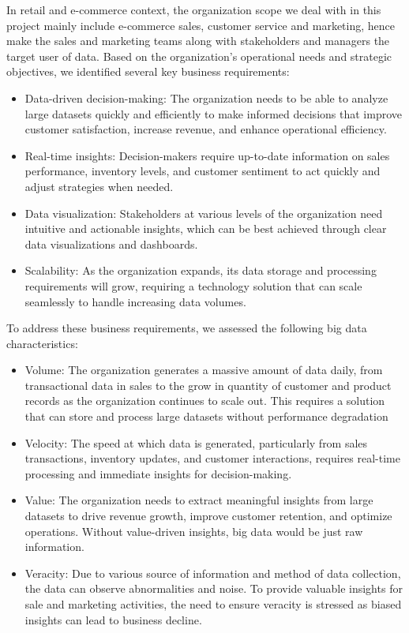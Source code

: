 In retail and e-commerce context, the organization scope we deal with in this project mainly include e-commerce sales,
customer service and marketing, hence make the sales and marketing teams along with stakeholders and managers the target
user of data. Based on the organization’s operational needs and strategic objectives, we identified several key business
requirements:
\begin{itemize}
    \item 
Data-driven decision-making: The organization needs to be able to analyze large datasets quickly and efficiently to make 
informed decisions that improve customer satisfaction, increase revenue, and enhance operational efficiency.
\item Real-time insights: Decision-makers require up-to-date information on sales performance, inventory levels, and customer
sentiment to act quickly and adjust strategies when needed.
\item Data visualization: Stakeholders at various levels of the organization need intuitive and actionable insights, which 
can be best achieved through clear data visualizations and dashboards.
\item Scalability: As the organization expands, its data storage and processing requirements will grow, requiring a technology
solution that can scale seamlessly to handle increasing data volumes.
\end{itemize}
To address these business requirements, we assessed the following big data characteristics:
\begin{itemize}
\item Volume: The organization generates a massive amount of data daily, from transactional data in sales to the grow in quantity
of customer and product records as the organization continues to scale out. This requires a solution that can store and process
large datasets without performance degradation
\item Velocity: The speed at which data is generated, particularly from sales transactions, inventory updates, and customer
 interactions, requires real-time processing and immediate insights for decision-making.
\item Value: The organization needs to extract meaningful insights from large datasets to drive revenue growth, improve
customer retention, and optimize operations. Without value-driven insights, big data would be just raw information.
\item Veracity: Due to various source of information and method of data collection, the data can observe abnormalities and
noise. To provide valuable insights for sale and marketing activities, the need to ensure veracity is stressed as biased 
insights can lead to business decline.
\end{itemize}
\newpage
